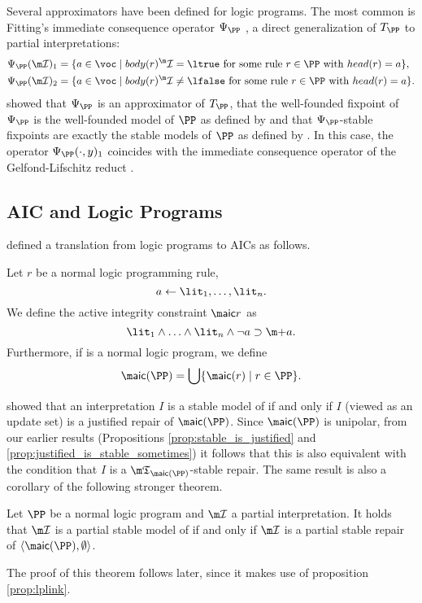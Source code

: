 Several approximators have been defined for logic programs. The most common is Fitting's immediate consequence operator $\Psi_\PP$ \cite{tcs/Fitting02}, a direct
generalization of $T_\PP$ to partial interpretations:
  \begin{align*}
    \Psi_\PP(\pstruct)_1 &=\{a\in \voc\mid body(r)^\pstruct=\ltrue \text{ for some rule $r\in \PP$ with }head(r)=a\},\\
    \Psi_\PP(\pstruct)_2 &=\{a\in \voc\mid body(r)^\pstruct\neq \lfalse \text{ for some rule $r\in \PP$ with }head(r)=a\}.
   \end{align*}
\citet{DeneckerMT00} showed that $\Psi_\PP$ is an approximator of $T_\PP$, that  the well-founded fixpoint of $\Psi_\PP$ is the well-founded model of $\PP$ as defined by \citeauthor{GelderRS91} and that $\Psi_\PP$-stable fixpoints are exactly the stable models of $\PP$ as defined by \citeauthor{iclp/GelfondL88}. In this case, 
the operator $\Psi_\PP(\cdot,y)_1$ coincides with the immediate consequence operator of the Gelfond-Lifschitz reduct \cite{iclp/GelfondL88}. 




\subsection{AIC and Logic Programs}
\citet{tplp/CaropreseT11} defined a translation from logic programs to AICs as follows. 
\begin{definition}
 Let $r$ be a normal logic programming rule, 
 \[a\leftarrow \lit_1,\dots,\lit_n.\]
 We define the active integrity constraint $\aicop r$ as 
 \[\lit_1\wedge\ldots\wedge\lit_n\wedge\neg a \aicrule \add a.\]
 Furthermore, if \PP is a normal logic program, we define 
 \[\aicop(\PP)=\bigcup\{\aicop(r)\mid r\in \PP\}.\]
\end{definition}

\citet{tplp/CaropreseT11} showed that an interpretation $I$ is a stable model of \PP if and only if $I$ (viewed as an update set) is a justified repair of $\aicop(\PP)$. Since $\aicop(\PP)$ is unipolar, from our earlier results (Propositions \ref{prop:stable_is_justified} and \ref{prop:justified_is_stable_sometimes}) it follows that this is also equivalent with the condition that $I$ is a $\threeap_{\aicop(\PP)}$-stable repair. 
The same result is also a corollary of the following stronger theorem. 
\begin{theorem}\label{thm:partialstable-LP}
 Let $\PP$ be a normal logic program and $\pstruct$ a partial interpretation. It holds that $\pstruct$ is a partial stable model of \PP if and only if $\pstruct$ is a partial stable repair of $\langle \aicop(\PP),\emptyset\rangle$. 
\end{theorem}
The proof of this theorem follows later, since it makes use of proposition \ref{prop:lplink}. 

